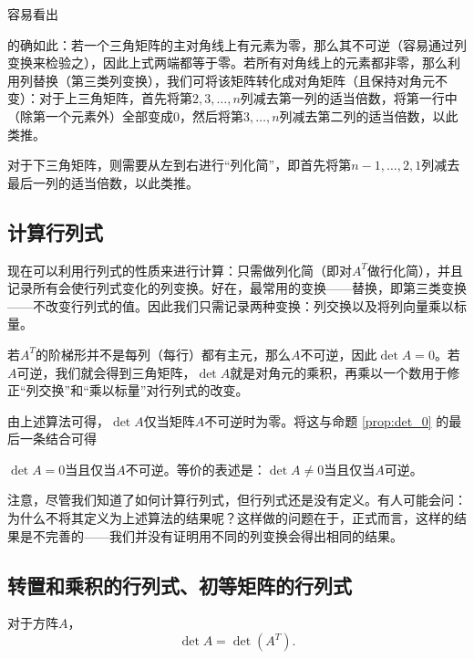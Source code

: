 容易看出\begin{center}
\end{center}

的确如此：若一个三角矩阵的主对角线上有元素为零，那么其不可逆（容易通过列变换来检验之），因此上式两端都等于零。若所有对角线上的元素都非零，那么利用列替换（第三类列变换），我们可将该矩阵转化成对角矩阵（且保持对角元不变）：对于上三角矩阵，首先将第$2,3,\dots,n$列减去第一列的适当倍数，将第一行中（除第一个元素外）全部变成$0$，然后将第$3,\dots,n$列减去第二列的适当倍数，以此类推。

对于下三角矩阵，则需要从左到右进行“列化简”，即首先将第$n-1,\dots,2,1$列减去最后一列的适当倍数，以此类推。

\subsection{计算行列式}

现在可以利用行列式的性质来进行计算：只需做列化简（即对$A^{T}$做行化简），并且记录所有会使行列式变化的列变换。好在，最常用的变换——替换，即第三类变换——不改变行列式的值。因此我们只需记录两种变换：列交换以及将列向量乘以标量。

若$A^T$的阶梯形并不是每列（每行）都有主元，那么$A$不可逆，因此$\det A = 0$。若$A$可逆，我们就会得到三角矩阵，$\det A$就是对角元的乘积，再乘以一个数用于修正“列交换”和“乘以标量”对行列式的改变。

由上述算法可得，$\det A$仅当矩阵$A$不可逆时为零。将这与命题 \ref{prop:det_0} 的最后一条结合可得
\begin{proposition}
  $\det A=0$当且仅当$A$不可逆。等价的表述是：$\det A\ne 0$当且仅当$A$可逆。
\end{proposition}

注意，尽管我们知道了如何计算行列式，但行列式还是没有定义。有人可能会问：为什么不将其定义为上述算法的结果呢？这样做的问题在于，正式而言，这样的结果是不完善的——我们并没有证明用不同的列变换会得出相同的结果。

\subsection{转置和乘积的行列式、初等矩阵的行列式}

\begin{theorem}[转置的行列式]\label{thm:det_trans}
  对于方阵$A$，\[\det A = \det(A^T).\]
\end{theorem}

